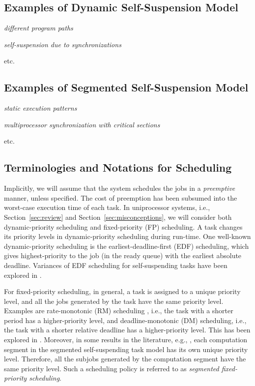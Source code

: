 \subsection{Examples of Dynamic Self-Suspension Model} 
  \textit{different program paths}
  
  \textit{self-suspension due to synchronizations}
  
  etc.
  
\subsection{Examples of Segmented Self-Suspension Model} 
  \textit{static execution patterns}
  
  \textit{multiprocessor synchronization with critical sections}
 
  etc.
  
\subsection{Terminologies and Notations for Scheduling}

Implicitly, we will assume that the system schedules the jobs in a
\emph{preemptive} manner, unless specified.  The cost of preemption
has been subsumed into the worst-case execution time of each task. In
uniprocessor systems, i.e., Section~\ref{sec:review} and
Section~\ref{sec:misconceptions}, we will consider both
dynamic-priority scheduling and fixed-priority (FP)
scheduling. A task changes its priority levels in dynamic-priority
scheduling during run-time. One well-known dynamic-priority scheduling
is the earliest-deadline-first (EDF) scheduling, which gives
highest-priority to the job (in the ready queue) with the earliest
absolute deadline. Variances of EDF scheduling for self-suspending
tasks have been explored in
\cite{RTSS-ChenL14,Liu_2014,DBLP:conf/ecrts/Devi03,WC16-suspend-DATE}.

For fixed-priority scheduling, in general, a task is assigned to a
unique priority level, and all the jobs generated by the task have the
same priority level. Examples are rate-monotonic (RM) scheduling
\cite{Liu_1973}, i.e., the task with a shorter period has a
higher-priority level, and deadline-monotonic (DM) scheduling, i.e.,
the task with a shorter relative deadline has a higher-priority level.
This has been explored in
\cite{Raj:suspension1991,RTCSA-KimCPKH95,PH:rtss98,ECRTS-AudsleyB04,RTAS-AudsleyB04,RTCSA-BletsasA05,RTAS-LakshmananR10,RTSS-KimANR13,LiuChen:rtss2014,huangpass:dac2015,Huang:multiseg,WC16-suspend-DATE}.
Moreover, in some results in the literature, e.g.,
\cite{RTSS-KimANR13,DBLP:journals/ieicet/DingTT09}, each computation
segment in the segmented self-suspending task model has its own unique
priority level. Therefore, all the subjobs generated by the
computation segment have the same priority level. Such a scheduling
policy is referred to as \emph{segmented fixed-priority scheduling}.

